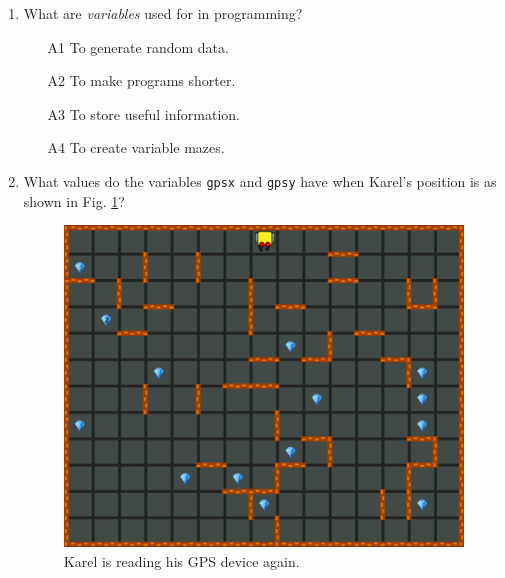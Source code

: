 {{{{\begin{enumerate}
\item What are {\em variables} used for in programming? 
\begin{enumerate}
\item[A1] To generate random data.
\item[A2] To make programs shorter.
\item[A3] To store useful information.
\item[A4] To create variable mazes.
\end{enumerate}
\item What values do the variables {\tt gpsx} and {\tt gpsy} have when Karel's
position is as shown in Fig. \ref{fig:var2}?
\newpage
\begin{figure}[!ht]
\begin{center}
\includegraphics[height=0.4\textwidth]{imgk/variables2.png}
\end{center}
\vspace{-4mm}
\caption{Karel is reading his GPS device again.}
\label{fig:var2}
\end{figure}
\noindent


\end{enumerate}}}}}
